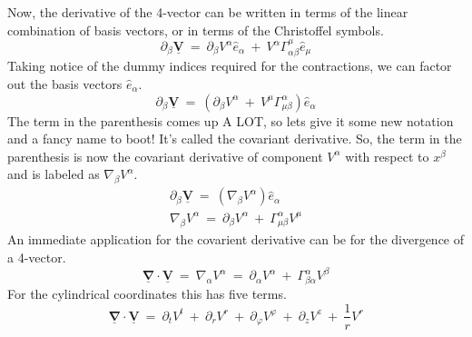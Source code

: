 Now, the derivative of the 4-vector can be written in terms of the linear combination of basis vectors, or in terms of the
Christoffel symbols.
\begin{equation}
  \partial_{\beta}\underline{\mathbf{V}}\ =\
  \partial_{\beta}V^{\alpha}\hat{e}_{\alpha}\ +\ V^{\alpha}\Gamma^{\mu}_{\alpha\beta}\hat{e}_{\mu}
\end{equation}
Taking notice of the dummy indices required for the contractions, we can factor out the basis vectors $\hat{e}_{\alpha}$.
\begin{equation}
  \partial_{\beta}\underline{\mathbf{V}}\ =\
  \left (\partial_{\beta}V^{\alpha}\ +\ V^{\mu}\Gamma^{\alpha}_{\mu\beta}\right )\hat{e}_{\alpha}
\end{equation}
The term in the parenthesis comes up A LOT, so lets give it some new notation and a fancy name to boot!  It's called
the covariant derivative.  So, the term in the parenthesis is now the covariant derivative of component $V^{\alpha}$
with respect to $x^{\beta}$ and is labeled as $\nabla_{\beta}V^{\alpha}$.
\begin{equation}
  \begin{gathered}
    \partial_{\beta}\underline{\mathbf{V}}\ =\
    \left (\nabla_{\beta}V^{\alpha}\right )\hat{e}_{\alpha} \\
    \nabla_{\beta}V^{\alpha}\ =\ \partial_{\beta}V^{\alpha}\ +\ \Gamma^{\alpha}_{\mu\beta}V^{\mu}
  \end{gathered}
\end{equation}
An immediate application for the covarient derivative can be for the divergence of a 4-vector.
\begin{equation}
  \underline{\mathbf{\nabla}}\cdot\underline{\mathbf{V}}\ =\ \nabla_{\alpha}V^{\alpha}\ =\
  \partial_{\alpha}V^{\alpha}\ +\ \Gamma^{\alpha}_{\beta\alpha}V^{\beta}
\end{equation}
For the cylindrical coordinates this has five terms.
\begin{equation}
  \underline{\mathbf{\nabla}}\cdot\underline{\mathbf{V}}\ =\
  \partial_{t}V^{t}\ +\ \partial_{r}V^{r}\ +\ \partial_{\varphi}V^{\varphi}\ +\ \partial_{z}V^{z}\ +\ \frac{1}{r}V^{r}
\end{equation}

